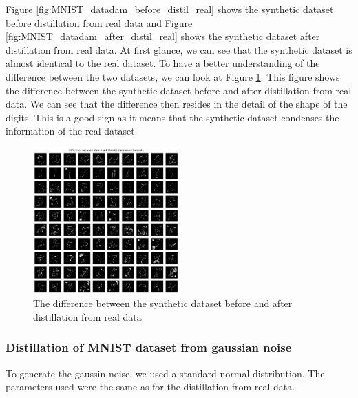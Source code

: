 \documentclass[onecolumn]{IEEEtran}
\begin{document}
Figure \ref{fig:MNIST_datadam_before_distil_real} shows the synthetic dataset before distillation from real data and Figure \ref{fig:MNIST_datadam_after_distil_real} shows the synthetic dataset after distillation from real data. At first glance, we can see that the synthetic dataset is almost identical to the real dataset. To have a better understanding of the difference between the two datasets, we can look at Figure \ref{fig:MNIST_diff_real}. This figure shows the difference between the synthetic dataset before and after distillation from real data. We can see that the difference then resides in the detail of the shape of the digits. This is a good sign as it means that the synthetic dataset condenses the information of the real dataset.
\begin{figure}[H]
    \centering
    \includegraphics[width=0.5\textwidth]{images/MNIST_diff_real.png}
    \caption{The difference between the synthetic dataset before and after distillation from real data}
    \label{fig:MNIST_diff_real}
\end{figure}

\subsubsection{Distillation of MNIST dataset from gaussian noise}
To generate the gaussin noise, we used a standard normal distribution. The parameters used were the same as for the distillation from real data.
\end{document}
